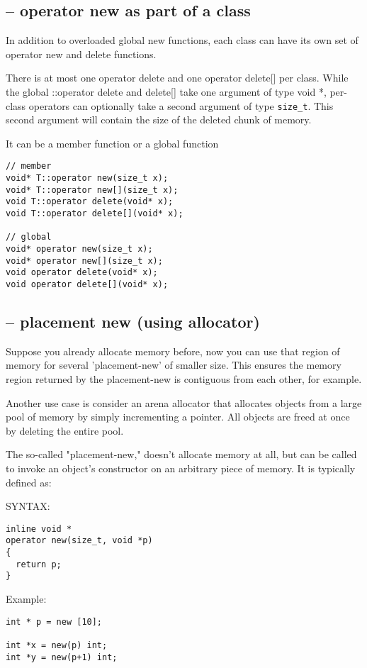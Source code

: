 \subsection{-- operator new as part of a class}

In addition to overloaded global new functions, each class can have its own set
of operator new and delete functions.

There is at most one operator delete and one operator delete[] per class.
While the global ::operator delete and delete[] take one argument of type void
*, per-class operators can optionally take a second argument of type \verb!size_t!.
This second argument will contain the size of the deleted chunk of memory.



It can be a member function or a global function
\begin{verbatim}
// member
void* T::operator new(size_t x);
void* T::operator new[](size_t x);
void T::operator delete(void* x);
void T::operator delete[](void* x);

// global
void* operator new(size_t x);
void* operator new[](size_t x);
void operator delete(void* x);
void operator delete[](void* x);
\end{verbatim}

\subsection{-- placement new (using allocator)}

Suppose you already allocate memory before, now you can use that region of
memory for several 'placement-new' of smaller size.
This ensures the memory region returned by the placement-new is contiguous from
each other, for example.

Another use case is consider an arena allocator that allocates objects from a
large pool of memory by simply incrementing a pointer. All objects are freed at
once by deleting the entire pool.
 

The so-called "placement-new," doesn't allocate memory at all, but can be called
to invoke an object's constructor on an arbitrary piece of memory. It is
typically defined as:

SYNTAX:
\begin{lstlisting}
inline void *
operator new(size_t, void *p)
{
  return p;
}

\end{lstlisting}

Example: 
\begin{verbatim}
int * p = new [10];

int *x = new(p) int;
int *y = new(p+1) int;
\end{verbatim}

